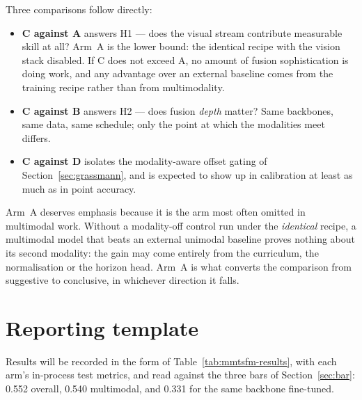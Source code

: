 Three comparisons follow directly:

\begin{itemize}
  \item \textbf{C against A} answers H1 --- does the visual stream contribute measurable
    skill at all? Arm~A is the lower bound: the identical recipe with the vision stack
    disabled. If C does not exceed A, no amount of fusion sophistication is doing work, and
    any advantage over an external baseline comes from the training recipe rather than from
    multimodality.
  \item \textbf{C against B} answers H2 --- does fusion \emph{depth} matter? Same backbones,
    same data, same schedule; only the point at which the modalities meet differs.
  \item \textbf{C against D} isolates the modality-aware offset gating of
    Section~\ref{sec:grassmann}, and is expected to show up in calibration at least as much
    as in point accuracy.
\end{itemize}

Arm~A deserves emphasis because it is the arm most often omitted in multimodal work. Without
a modality-off control run under the \emph{identical} recipe, a multimodal model that beats
an external unimodal baseline proves nothing about its second modality: the gain may come
entirely from the curriculum, the normalisation or the horizon head. Arm~A is what converts
the comparison from suggestive to conclusive, in whichever direction it falls.

\section{Reporting template}
\label{sec:reporting}

Results will be recorded in the form of Table~\ref{tab:mmtsfm-results}, with each arm's
in-process test metrics, and read against the three bars of Section~\ref{sec:bar}: 0.552
overall, 0.540 multimodal, and 0.331 for the same backbone fine-tuned.

